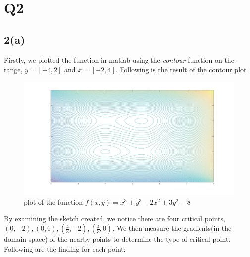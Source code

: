 \documentclass{article}
\begin{document}
\section{Q2}

\subsection*{2(a)}
Firstly, we plotted the function in matlab using the \textit{contour} function on the range, $y=[-4,2]$ and $x=[-2,4]$. Following is the result of the contour plot
\begin{figure}[H]
\centering
\includegraphics[width=6.5in]{figures/2a.jpg}
\caption{plot of the function $f(x,y) = x^3 + y^3 -2x^2 + 3y^2 - 8$}
\end{figure}
By examining the sketch created, we notice there are four critical points, $(0,-2),(0,0),(\frac{4}{3},-2),(\frac{4}{3},0)$.
We then measure the gradients(in the domain space) of the nearby points to determine the type of critical point. 
Following are the finding for each point:
\end{document}
